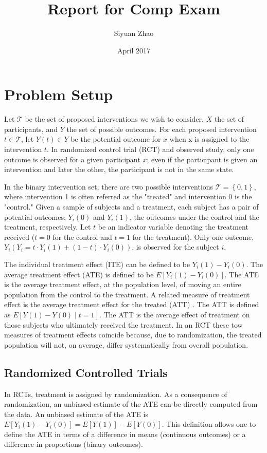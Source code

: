 \documentclass{article}
\title{Report for Comp Exam}
\author{Siyuan Zhao}
\date{April 2017}
\begin{document}
\maketitle

\section{Problem Setup}
Let $\mathcal{T}$ be the set of proposed interventions we wish to
consider, $X$ the set of participants, and $Y$ the set of possible
outcomes. For each proposed intervention $t \in \mathcal{T}$, let
$Y(t) \in Y$ be the potential outcome for $x$ when x is assigned to
the intervention $t$. In randomized control trial (RCT) and observed
study, only one outcome is observed for a given participant $x$; even
if the participant is given an intervention and later the other, the
participant is not in the same state.

In the binary intervention set, there are two possible interventions
$\mathcal{T} = \left \{  0, 1 \right \}$, where intervention 1 is
often referred as the "treated" and intervention 0 is the "control."
Given a sample of subjects and a treatment, each subject has a pair of
potential outcomes: $Y_i(0)$ and $Y_i(1)$, the outcomes under the
control and the treatment, respectively. Let $t$ be an indicator
variable denoting the treatment received ($t = 0$ for the control and
$t=1$ for the treatment). Only one outcome, $Y_i (Y_i=t\cdot Y_i(1) +
(1-t) \cdot Y_i(0))$, is observed for the
subject $i$.

The individual treatment effect (ITE) can be defined to
be $Y_i(1) - Y_i(0)$. The average treatment effect (ATE) is defined to
be $E[Y_i(1) - Y_i(0)]$. The ATE is the average treatment effect, at
the population level, of moving an entire population from the control
to the treatment. A related measure of treatment effect is the average
treatment effect for the treated (ATT) \cite{imbens2004}. The ATT is
defined as $E[Y(1)-Y(0) \mid t=1]$. The ATT is the average effect of
treatment on those subjects who ultimately received the treatment. In
an RCT these tow measures of treatment effects coincide because, due
to randomization, the treated population will not, on average, differ
systematically from overall population.

\subsection{Randomized Controlled Trials}
In RCTs, treatment is assigned by randomization. As a consequence of
randomization, an unbiased estimate of the ATE can be directly
computed from the data. An unbiased estimate of the ATE is
$E[Y_i(1)-Y_i(0)]=E[Y(1)] - E[Y(0)]$. This definition allows one to
define the ATE in terms of a difference in means (continuous outcomes)
or a difference in proportions (binary outcomes).
\end{document}
